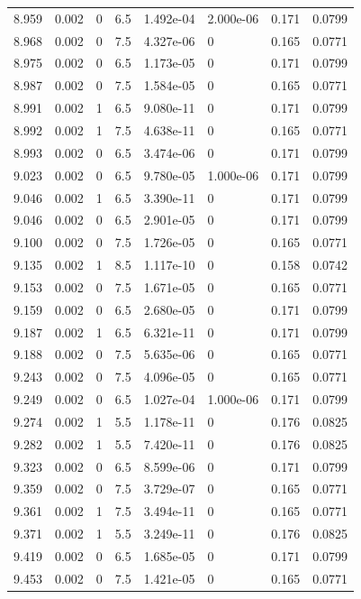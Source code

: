 \documentclass[preview]{standalone}
\begin{document}
{{{{{{{{{{\begin{tabular}{L{1.2cm}C{1.2cm} C{0.3cm}C{0.5cm} C{1.4cm}C{1.4cm} C{1.4cm}C{1.4cm}}
  8.959  &  0.002  & 0     & 6.5 &  1.492e-04  & 2.000e-06  & 0.171 &  0.0799   \\ 
  8.968  &  0.002  & 0     & 7.5 &  4.327e-06  & 0  & 0.165 &  0.0771   \\ 
  8.975  &  0.002  & 0     & 6.5 &  1.173e-05  & 0  & 0.171 &  0.0799   \\ 
  8.987  &  0.002  & 0     & 7.5 &  1.584e-05  & 0  & 0.165 &  0.0771   \\ 
  8.991  &  0.002  & 1     & 6.5 &  9.080e-11  & 0  & 0.171 &  0.0799   \\ 
  8.992  &  0.002  & 1     & 7.5 &  4.638e-11  & 0  & 0.165 &  0.0771   \\ 
  8.993  &  0.002  & 0     & 6.5 &  3.474e-06  & 0  & 0.171 &  0.0799   \\ 
  9.023  &  0.002  & 0     & 6.5 &  9.780e-05  & 1.000e-06  & 0.171 &  0.0799   \\ 
  9.046  &  0.002  & 1     & 6.5 &  3.390e-11  & 0  & 0.171 &  0.0799   \\ 
  9.046  &  0.002  & 0     & 6.5 &  2.901e-05  & 0  & 0.171 &  0.0799   \\ 
  9.100  &  0.002  & 0     & 7.5 &  1.726e-05  & 0  & 0.165 &  0.0771   \\ 
  9.135  &  0.002  & 1     & 8.5 &  1.117e-10  & 0  & 0.158 &  0.0742   \\ 
  9.153  &  0.002  & 0     & 7.5 &  1.671e-05  & 0  & 0.165 &  0.0771   \\ 
  9.159  &  0.002  & 0     & 6.5 &  2.680e-05  & 0  & 0.171 &  0.0799   \\ 
  9.187  &  0.002  & 1     & 6.5 &  6.321e-11  & 0  & 0.171 &  0.0799   \\ 
  9.188  &  0.002  & 0     & 7.5 &  5.635e-06  & 0  & 0.165 &  0.0771   \\ 
  9.243  &  0.002  & 0     & 7.5 &  4.096e-05  & 0  & 0.165 &  0.0771   \\ 
  9.249  &  0.002  & 0     & 6.5 &  1.027e-04  & 1.000e-06  & 0.171 &  0.0799   \\ 
  9.274  &  0.002  & 1     & 5.5 &  1.178e-11  & 0  & 0.176 &  0.0825   \\ 
  9.282  &  0.002  & 1     & 5.5 &  7.420e-11  & 0  & 0.176 &  0.0825   \\ 
  9.323  &  0.002  & 0     & 6.5 &  8.599e-06  & 0  & 0.171 &  0.0799   \\ 
  9.359  &  0.002  & 0     & 7.5 &  3.729e-07  & 0  & 0.165 &  0.0771   \\ 
  9.361  &  0.002  & 1     & 7.5 &  3.494e-11  & 0  & 0.165 &  0.0771   \\ 
  9.371  &  0.002  & 1     & 5.5 &  3.249e-11  & 0  & 0.176 &  0.0825   \\ 
  9.419  &  0.002  & 0     & 6.5 &  1.685e-05  & 0  & 0.171 &  0.0799   \\ 
  9.453  &  0.002  & 0     & 7.5 &  1.421e-05  & 0  & 0.165 &  0.0771   \\ 
\hline 
\end{tabular} 

}}}}}}}}}}
\end{document}
